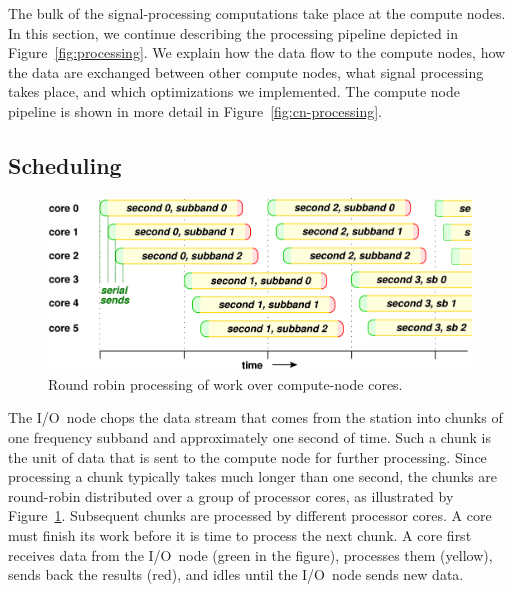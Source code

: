 \documentclass{sig-alternate}
\begin{document}
The bulk of the signal-processing computations take place at the compute nodes.
In this section, we continue describing the processing pipeline depicted in
Figure~\ref{fig:processing}. 
We explain how the data flow to the compute nodes, how the data are exchanged
between other compute nodes, what signal processing takes place, and which
optimizations we implemented. The compute node pipeline is shown in more detail
in Figure~\ref{fig:cn-processing}.


\subsection{Scheduling}

\begin{figure}[ht]
\includegraphics[width=\columnwidth]{round-robin.pdf}
\caption{Round robin processing of work over compute-node cores.}
\label{fig:round-robin}
\end{figure}

The I/O~node chops the data stream that comes from the station into chunks of
one frequency subband and approximately one second of time.
Such a chunk is the unit of data that is sent to the compute node for further
processing.
Since processing a chunk typically takes much longer than one second,
the chunks are round-robin distributed over a group of processor cores,
as illustrated by Figure~\ref{fig:round-robin}.
Subsequent chunks are processed by different processor cores.
A core must finish its work before it is time to process the next chunk.
A core first receives data from the I/O~node (green in the figure),
processes them (yellow), sends back the results (red), and idles until the
I/O~node sends new data.
\end{document}
